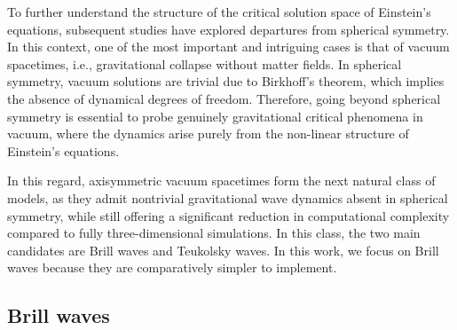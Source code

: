 To further understand the structure of the critical solution space of Einstein's equations, subsequent studies have explored departures from spherical symmetry. In this context, one of the most important and intriguing cases is that of vacuum spacetimes, i.e., gravitational collapse without matter fields. In spherical symmetry, vacuum solutions are trivial due to Birkhoff's theorem, which implies the absence of dynamical degrees of freedom. Therefore, going beyond spherical symmetry is essential to probe genuinely gravitational critical phenomena in vacuum, where the dynamics arise purely from the non-linear structure of Einstein's equations.

In this regard, axisymmetric vacuum spacetimes form the next natural class of models, as they admit nontrivial gravitational wave dynamics absent in spherical symmetry, while still offering a significant reduction in computational complexity compared to fully three-dimensional simulations. In this class, the two main candidates are Brill waves and Teukolsky waves. In this work, we focus on Brill waves because they are comparatively simpler to implement.

\subsection{Brill waves}

